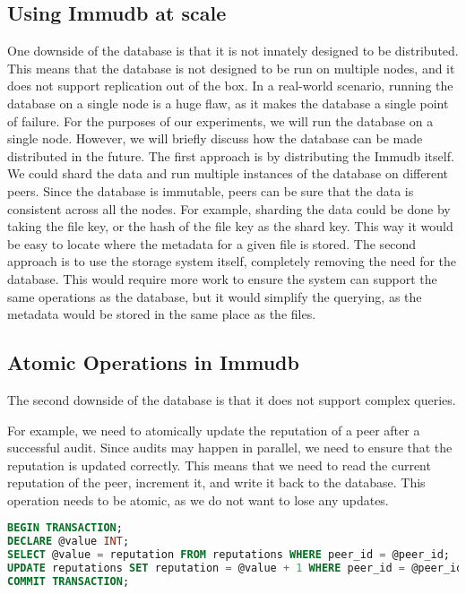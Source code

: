 \subsection{Using Immudb at scale}

One downside of the database is that it is not innately designed to be distributed.
This means that the database is not designed to be run on multiple nodes,
and it does not support replication out of the box.
In a real-world scenario, running the database on a single node is a huge flaw,
as it makes the database a single point of failure.
For the purposes of our experiments, we will run the database on a single node.
However, we will briefly discuss how the database can be made distributed in the future.
The first approach is by distributing the Immudb itself.
We could shard the data and run multiple instances of the database on different peers.
Since the database is immutable, peers can be sure that the data is consistent across all the nodes.
For example, sharding the data could be done by taking the file key, or the hash of the file key as the shard key.
This way it would be easy to locate where the metadata for a given file is stored.
The second approach is to use the storage system itself, completely removing the need for the database.
This would require more work to ensure the system can support the same operations as the database,
but it would simplify the querying, as the metadata would be stored in the same place as the files.

\subsection{Atomic Operations in Immudb}

The second downside of the database is that it does not support complex queries.

For example, we need to atomically update the reputation of a peer after a successful audit.
Since audits may happen in parallel, we need to ensure that the reputation is updated correctly.
This means that we need to read the current reputation of the peer, increment it, and write it back to the database.
This operation needs to be atomic, as we do not want to lose any updates.

\begin{lstlisting}[language=SQL, caption={SQL query to update the reputation of a peer}, label={lst:sql-query}]
BEGIN TRANSACTION;
DECLARE @value INT;
SELECT @value = reputation FROM reputations WHERE peer_id = @peer_id;
UPDATE reputations SET reputation = @value + 1 WHERE peer_id = @peer_id;
COMMIT TRANSACTION;
\end{lstlisting}

